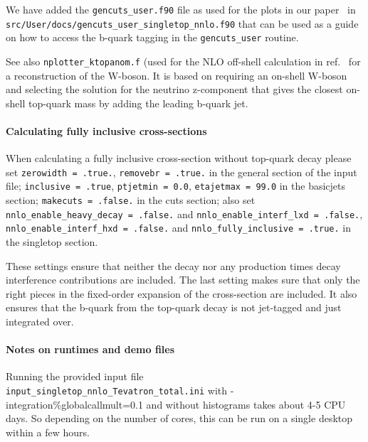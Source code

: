 We have added the \texttt{gencuts\_user.f90} file as used for the plots
in our paper~\cite{Campbell:2020fhf} in \\
\texttt{src/User/docs/gencuts\_user\_singletop\_nnlo.f90} that can be
used as a guide on how to access the b-quark tagging in the
\texttt{gencuts\_user} routine.

See also \texttt{nplotter\_ktopanom.f} (used for the NLO off-shell
calculation in ref.~\cite{Neumann:2019kvk} for a reconstruction of the
W-boson. It is based on requiring an on-shell W-boson and selecting the
solution for the neutrino z-component that gives the closest on-shell
top-quark mass by adding the leading b-quark jet.

\paragraph{Calculating fully inclusive
cross-sections}\label{calculating-fully-inclusive-cross-sections}

When calculating a fully inclusive cross-section without top-quark decay
please set \texttt{zerowidth\ =\ .true.},
\texttt{removebr\ =\ .true.} in the general section of the input file;
\texttt{inclusive\ =\ .true}, \texttt{ptjetmin\ =\ 0.0},
\texttt{etajetmax\ =\ 99.0} in the basicjets section;
\texttt{makecuts\ =\ .false.} in the cuts section; also set
\texttt{nnlo\_enable\_heavy\_decay\ =\ .false.} and
\texttt{nnlo\_enable\_interf\_lxd\ =\ .false.},
\texttt{nnlo\_enable\_interf\_hxd\ =\ .false.} and
\texttt{nnlo\_fully\_inclusive\ =\ .true.} in the singletop section.

These settings ensure that neither the decay nor any production times
decay interference contributions are included. The last setting makes
sure that only the right pieces in the fixed-order expansion of the
cross-section are included. It also ensures that the b-quark from the
top-quark decay is not jet-tagged and just integrated over.

\paragraph{Notes on runtimes and demo
files}\label{notes-on-runtimes-and-demo-files}

Running the provided input file \\
\texttt{input\_singletop\_nnlo\_Tevatron\_total.ini} with
-integration\%globalcallmult=0.1 and without histograms takes about 4-5
CPU days. So depending on the number of cores, this can be run on a
single desktop within a few hours.

